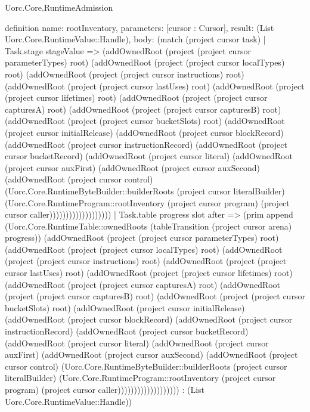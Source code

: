 \begin{lexlean}{Uorc.Core.RuntimeAdmission}
\begin{semanticmodule}
definition{
  name: rootInventory,
  parameters: [cursor : Cursor],
  result: (List Uorc.Core.RuntimeValue::Handle),
  body: (match (project cursor task)
    | Task.stage stageValue => (addOwnedRoot (project (project cursor parameterTypes) root) (addOwnedRoot (project (project cursor localTypes) root) (addOwnedRoot (project (project cursor instructions) root) (addOwnedRoot (project (project cursor lastUses) root) (addOwnedRoot (project (project cursor lifetimes) root) (addOwnedRoot (project (project cursor capturesA) root) (addOwnedRoot (project (project cursor capturesB) root) (addOwnedRoot (project (project cursor bucketSlots) root) (addOwnedRoot (project cursor initialRelease) (addOwnedRoot (project cursor blockRecord) (addOwnedRoot (project cursor instructionRecord) (addOwnedRoot (project cursor bucketRecord) (addOwnedRoot (project cursor literal) (addOwnedRoot (project cursor auxFirst) (addOwnedRoot (project cursor auxSecond) (addOwnedRoot (project cursor control) (Uorc.Core.RuntimeByteBuilder::builderRoots (project cursor literalBuilder) (Uorc.Core.RuntimeProgram::rootInventory (project cursor program) (project cursor caller)))))))))))))))))))
    | Task.table progress slot after => (prim append (Uorc.Core.RuntimeTable::ownedRoots (tableTransition (project cursor arena) progress)) (addOwnedRoot (project (project cursor parameterTypes) root) (addOwnedRoot (project (project cursor localTypes) root) (addOwnedRoot (project (project cursor instructions) root) (addOwnedRoot (project (project cursor lastUses) root) (addOwnedRoot (project (project cursor lifetimes) root) (addOwnedRoot (project (project cursor capturesA) root) (addOwnedRoot (project (project cursor capturesB) root) (addOwnedRoot (project (project cursor bucketSlots) root) (addOwnedRoot (project cursor initialRelease) (addOwnedRoot (project cursor blockRecord) (addOwnedRoot (project cursor instructionRecord) (addOwnedRoot (project cursor bucketRecord) (addOwnedRoot (project cursor literal) (addOwnedRoot (project cursor auxFirst) (addOwnedRoot (project cursor auxSecond) (addOwnedRoot (project cursor control) (Uorc.Core.RuntimeByteBuilder::builderRoots (project cursor literalBuilder) (Uorc.Core.RuntimeProgram::rootInventory (project cursor program) (project cursor caller))))))))))))))))))) : (List Uorc.Core.RuntimeValue::Handle))
}
\end{semanticmodule}
\end{lexlean}
